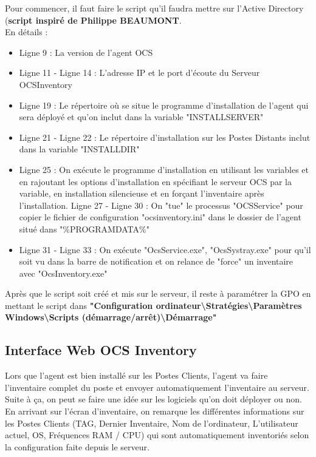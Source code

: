 \documentclass[11pt,a4paper,oneside]{article}
\begin{document}
Pour commencer, il faut faire le script qu'il faudra mettre sur l'Active Directory (\textbf{script inspiré de Philippe BEAUMONT}.\\
En détails : 
\begin{itemize}
\item Ligne 9 : La version de l'agent OCS
\item Ligne 11 - Ligne 14 : L'adresse IP et le port d'écoute du Serveur OCSInventory
\item Ligne 19 : Le répertoire où se situe le programme d'installation de l'agent qui sera déployé et qu'on inclut dans la variable "INSTALLSERVER"
\item Ligne 21 - Ligne 22 : Le répertoire d'installation sur les Postes Distants inclut dans la variable "INSTALLDIR"
\item Ligne 25 : On exécute le programme d'installation en utilisant les variables et en rajoutant les options d'installation en spécifiant le serveur OCS par la variable, en installation silencieuse et en forçant l'inventaire après l'installation.
Ligne 27 - Ligne 30 : On "tue" le processus "OCSService" pour copier le fichier de configuration "ocsinventory.ini" dans le dossier de l'agent situé dans "\%PROGRAMDATA\%"
\item Ligne 31 - Ligne 33 : On exécute "OcsService.exe", "OcsSystray.exe" pour qu'il soit vu dans la barre de notification et on relance de "force" un inventaire avec "OcsInventory.exe" \\
\end{itemize}
Après que le script soit créé et mis sur le serveur, il reste à paramétrer la GPO en mettant le script dans \textbf{"Configuration ordinateur\textbackslash Stratégies\textbackslash  Paramètres Windows\textbackslash  Scripts (démarrage/arrêt)\textbackslash Démarrage"}
\newpage
\subsection{Interface Web OCS Inventory}
Lors que l'agent est bien installé sur les Postes Clients, l'agent va faire l'inventaire complet du poste et envoyer automatiquement l'inventaire au serveur. Suite à ça, on peut se faire une idée sur les logiciels qu'on doit déployer ou non. \\

En arrivant sur l'écran d'inventaire, on remarque les différentes informations sur les Postes Clients (TAG, Dernier Inventaire, Nom de l'ordinateur, L'utilisateur actuel, OS, Fréquences RAM / CPU) qui sont automatiquement inventoriés selon la configuration faite depuis le serveur.
\end{document}
